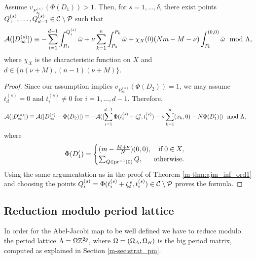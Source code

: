 \documentclass[main.tex]{subfiles}
\begin{document}
    \begin{thm}\label{thm:ajm_inf_ordgt1}
     Assume $v_{P_{\infty}^{(s)}}(\Phi(D_1)) > 1$. Then, for $s = 1,\dots,\delta$, there exist points $Q_1^{(s)},\dots,Q_{d-1}^{(s)} \in \mathcal{C} \setminus \mathcal{P}$ such that
    \begin{equation}\label{eq:ajm_int_ord0}
       \mathcal{A}( [D_{\infty}^{(s)}] ) \equiv -\sum_{i = 1}^{d-1} \int_{P_0}^{Q_i^{(s)}} \bar{\omega} + \nu \sum_{k=1}^n
      \int_{P_0}^{P_k} \bar{\omega} + \chi_{X}(0) (Nm-M-\nu) \int_{P_0}^{(0,0)}\bar{\omega} \mod \Lambda,
    \end{equation}
    where $\chi_{X}$ is the characteristic function on $X$ and $d \in \{n(\nu+M),(n-1)(\nu+M)\}$.
    \end{thm}
   \begin{proof}
    Since our assumption implies $v_{P_{\infty}^{(s)}}(\Phi(D_2)) = 1$, we may assume
    $t_d^{(s)} = 0$ and $t_i^{(s)} \ne 0$ for $i=1,\dots,d-1$. Therefore,
    \begin{align}
      \mathcal{A}( [D_{\infty}^{(s)}] )  & \equiv  \mathcal{A}([D_{\infty}^{(s)} - \Phi(D_2)])  
      \equiv  -\mathcal{A}( [\sum_{i = 1}^{d-1} \Phi(t_i^{(s)}+\zeta_{\delta}^s,t_i^{(s)}) - \nu \sum_{k=1}^n
      (x_k,0) - N \Phi(D_1') ] )
       \mod \Lambda,
    \end{align}
    where 
    \begin{equation}
     \Phi(D_1') = \begin{cases}
	      (m-\frac{M+\nu}{N})(0,0), \quad \text{if} \; 0 \in X, \\
            \sum_{Q \in \pr^{-1}(0)} Q, \hfill \text{otherwise.}
            \end{cases}
    \end{equation}
    Using the same argumentation as in the proof of Theorem \ref{m-thm:ajm_inf_ord1} and choosing the points $Q_i^{(s)} = \Phi(t_i^{(s)}+\zeta_{\delta}^s,t_i^{(s)}) \in \mathcal{C} \setminus \mathcal{P}$ 
    proves the formula.
     \end{proof}
    
    
  \subsection{Reduction modulo period lattice}\label{subsec:lat_red}

    In order for the Abel-Jacobi map to be well defined we have to reduce modulo the period lattice $\Lambda = 
  \Omega\mathbb{Z}^{2g}$, where $\Omega = (\Omega_A, \Omega_B)$ is the big period matrix, computed as explained in
  Section \ref{m-sec:strat_pm}.
   
\end{document}
